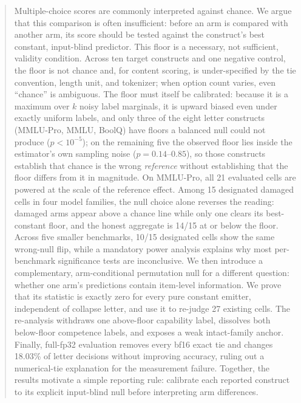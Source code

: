 \begin{abstract}
Multiple-choice scores are commonly interpreted against chance. We argue that this comparison is often insufficient: before an arm is compared with another arm, its score should be tested against the construct's best constant, input-blind predictor. This floor is a necessary, not sufficient, validity condition. Across ten target constructs and one negative control, the floor is not chance and, for content scoring, is under-specified by the tie convention, length unit, and tokenizer; when option count varies, even ``chance'' is ambiguous. The floor must itself be calibrated: because it is a maximum over $k$ noisy label marginals, it is upward biased even under exactly uniform labels, and only three of the eight letter constructs (MMLU-Pro, MMLU, BoolQ) have floors a balanced null could not produce ($p<10^{-5}$); on the remaining five the observed floor lies inside the estimator's own sampling noise ($p=0.14$--$0.85$), so those constructs establish that chance is the wrong \emph{reference} without establishing that the floor differs from it in magnitude. On MMLU-Pro, all 21 evaluated cells are powered at the scale of the reference effect. Among 15 designated damaged cells in four model families, the null choice alone reverses the reading: damaged arms appear above a chance line while only one clears its best-constant floor, and the honest aggregate is 14/15 at or below the floor. Across five smaller benchmarks, 10/15 designated cells show the same wrong-null flip, while a mandatory power analysis explains why most per-benchmark significance tests are inconclusive. We then introduce a complementary, arm-conditional permutation null for a different question: whether one arm's predictions contain item-level information. We prove that its statistic is exactly zero for every pure constant emitter, independent of collapse letter, and use it to re-judge 27 existing cells. The re-analysis withdraws one above-floor capability label, dissolves both below-floor competence labels, and exposes a weak intact-family anchor. Finally, full-fp32 evaluation removes every bf16 exact tie and changes 18.03\% of letter decisions without improving accuracy, ruling out a numerical-tie explanation for the measurement failure. Together, the results motivate a simple reporting rule: calibrate each reported construct to its explicit input-blind null before interpreting arm differences.
\end{abstract}
